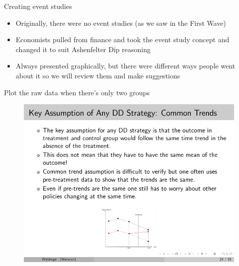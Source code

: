 \documentclass{beamer}
\begin{document}
\begin{frame}{Creating event studies}

\begin{itemize}

\item Originally, there were no event studies (as we saw in the First Wave)
\item Economists pulled from finance and took the event study concept and changed it to suit Ashenfelter Dip reasoning
\item Always presented graphically, but there were different ways people went about it so we will review them and make suggestions

\end{itemize}

\end{frame}



\begin{frame}{Plot the raw data when there's only two groups}

	\begin{figure}
	\includegraphics[scale=2.5]{./lecture_includes/waldinger_dd_6.pdf}
	\end{figure}

\end{frame}
\end{document}
